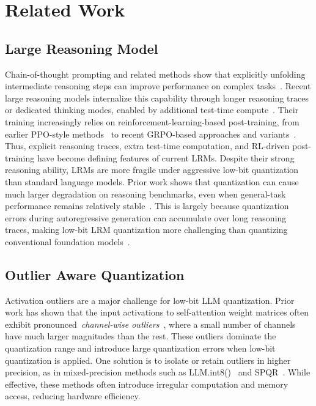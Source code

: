 \documentclass{article}
\begin{document}
\section{Related Work}
\subsection{Large Reasoning Model}
Chain-of-thought prompting and related methods show that explicitly unfolding intermediate reasoning steps can improve performance on complex tasks~\cite{wei2022chain,wang2022self,zelikman2024star}. Recent large reasoning models internalize this capability through longer reasoning traces or dedicated thinking modes, enabled by additional test-time compute~\cite{shao2024deepseekmath,guo2025deepseek,yang2025qwen3,agarwal2025gpt}. Their training increasingly relies on reinforcement-learning-based post-training, from earlier PPO-style methods~\cite{luong2024reft,xie2025interleaved} to recent GRPO-based approaches and variants~\cite{shao2024deepseekmath,guo2025deepseek,yu2025dapo,gao2025soft}. Thus, explicit reasoning traces, extra test-time computation, and RL-driven post-training have become defining features of current LRMs. Despite their strong reasoning ability, LRMs are more fragile under aggressive low-bit quantization than standard language models. Prior work shows that quantization can cause much larger degradation on reasoning benchmarks, even when general-task performance remains relatively stable~\cite{liu2025quantization,li2025quantizationmeetsreasoningexploring,zhao2025qspec}. This is largely because quantization errors during autoregressive generation can accumulate over long reasoning traces, making low-bit LRM quantization more challenging than quantizing conventional foundation models~\cite{liu2025quantization,liang2025paroquant,zhao2025qspec}.

\subsection{Outlier Aware Quantization}
Activation outliers are a major challenge for low-bit LLM quantization. Prior work has shown that the input activations to self-attention weight matrices often exhibit pronounced~\textit{channel-wise outliers}~\cite{dettmers2022gpt3,sun2024massive,xiang2024dfrot}, where a small number of channels have much larger magnitudes than the rest. These outliers dominate the quantization range and introduce large quantization errors when low-bit quantization is applied.
One solution is to isolate or retain outliers in higher precision, as in mixed-precision methods such as LLM.int8()~\cite{dettmers2022gpt3} and SPQR~\cite{dettmers2023spqr}. While effective, these methods often introduce irregular computation and memory access, reducing hardware efficiency.
\end{document}
